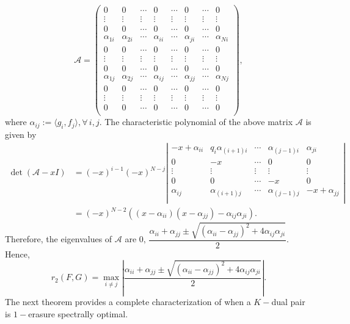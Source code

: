 \documentclass[final,1p,times]{elsarticle}
\begin{document}
	$$	\mathcal{A} = \begin{pmatrix}
		0 & 0  & \cdots &0 & \cdots &0 & \cdots &0\\
		\vdots &\vdots  &\vdots &\vdots &\vdots&\vdots &\vdots &\vdots \\
		0 & 0  & \cdots &0 & \cdots &0 & \cdots &0 \\
		\alpha_{1i} & \alpha_{2i} & \cdots &\alpha_{ii} & \cdots &\alpha_{ji} & \cdots &\alpha_{Ni} \\
		0 & 0  & \cdots &0 & \cdots &0 & \cdots &0\\
		\vdots &\vdots  &\vdots &\vdots &\vdots&\vdots &\vdots &\vdots \\
		0 & 0  & \cdots &0 & \cdots &0 & \cdots &0 \\
		\alpha_{1j} & \alpha_{2j} & \cdots &\alpha_{ij} & \cdots &\alpha_{jj} & \cdots &\alpha_{Nj} \\
		0 & 0  & \cdots &0 & \cdots &0 & \cdots &0\\
		\vdots &\vdots  &\vdots &\vdots &\vdots&\vdots &\vdots &\vdots \\
		0 & 0  & \cdots &0 & \cdots &0 & \cdots &0 \\
	\end{pmatrix},$$
	where $\alpha_{ij}:= \langle g_i , f_j \rangle, \forall\,i,j. $
	\noindent
	The characteristic polynomial of the above matrix $\mathcal{A}$ is given by
	\begin{align*}
		\det(\mathcal{A}-xI) &= (-x)^{i-1}(-x)^{N-j} \left|\begin{array}{ccccccc}
			-x +  \alpha_{ii} &q_i\alpha_{(i+1) i} &\cdots &\alpha_{(j-1)i} &\alpha_{ji}\\
			0 & -x  &\cdots& 0 &0\\
			\vdots &\vdots  &\vdots &\vdots &\vdots \\
			0 & 0  &\cdots& -x &0\\
			\alpha_{ij} & \alpha_{(i+1)j} & \cdots & \alpha_{(j-1)j} & -x + \alpha_{jj} \\
		\end{array}\right| \\ &= (-x)^{N-2} \left((x- \alpha_{ii})(x-\alpha_{jj}) -  \alpha_{ij} \alpha_{ji} \right).
	\end{align*}
	\noindent
	Therefore, the eigenvalues of $\mathcal{A}$ are $0,\, \dfrac{ \alpha_{ii} + \alpha_{jj} \pm \sqrt{( \alpha_{ii}-  \alpha_{jj})^2 + 4 \alpha_{ij} \alpha_{ji} }}{2}. $ Hence,
	\begin{equation} \label{eqn3point3}
		r_{2} (F,G) = \max_{i\neq j} \left| \frac{ \alpha_{ii} + \alpha_{jj} \pm \sqrt{( \alpha_{ii} -  \alpha_{jj})^2 + 4 \alpha_{ij}\alpha_{ji} }}{2} \right|.
	\end{equation}
	The next theorem provides a complete characterization of when a \( K-\)dual pair is $1-$erasure spectrally optimal.
\end{document}
